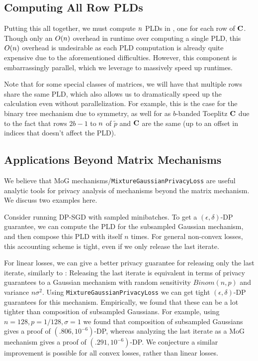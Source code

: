 \subsection{Computing All Row PLDs}
Putting this all together, we must compute $n$ PLDs in \MMCC{}, one for each row of $\mathbf{C}$. Though only an $O(n)$ overhead in runtime over computing a single PLD, this $O(n)$ overhead is undesirable as each PLD computation is already quite expensive due to the aforementioned difficulties. However, this component is embarrassingly parallel, which we leverage to massively speed up runtimes. 

Note that for some special classes of matrices, we will have that multiple rows share the same PLD, which also allows us to dramatically speed up the calculation even without parallelization. For example, this is the case for the binary tree mechanism due to symmetry, as well for as $b$-banded Toeplitz $\mathbf{C}$ due to the fact that rows $2b-1$ to $n$ of $\tilde{p}$ and $\mathbf{C}$ are the same (up to an offset in indices that doesn't affect the PLD).

\subsection{Applications Beyond Matrix Mechanisms}

We believe that MoG mechanisms/\texttt{MixtureGaussianPrivacyLoss} are useful analytic tools for privacy analysis of mechanisms beyond the matrix mechanism. We discuss two examples here.

 Consider running DP-SGD with sampled minibatches. To get a $(\epsilon, \delta)$-DP guarantee, we can compute the PLD for the subsampled Gaussian mechanism, and then compose this PLD with itself $n$ times. For general non-convex losses, this accounting scheme is tight, even if we only release the last iterate.

For linear losses, we can give a better privacy guarantee for releasing only the last iterate, similarly to \citep{feldman2018privacy}: Releasing the last iterate is equivalent in terms of privacy guarantees to a Gaussian mechanism with random sensitivity $Binom(n, p)$ and variance $n \sigma^2$. Using \texttt{MixtureGaussianPrivacyLoss} we can get tight $(\epsilon, \delta)$-DP guarantees for this mechanism. Empirically, we found that these can be a lot tighter than composition of subsampled Gaussians. For example, using $n = 128, p = 1 / 128, \sigma = 1$ we found that composition of subsampled Gaussians gives a proof of $(.806, 10^{-6})$-DP, whereas analyzing the last iterate as a MoG mechanism gives a proof of $(.291, 10^{-6})$-DP. We conjecture a similar improvement is possible for all convex losses, rather than linear losses.

